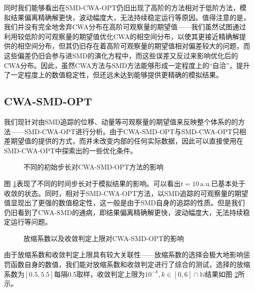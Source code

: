 同时我们能够看出在SMD-CWA-OPT仍旧出现了高阶的方法相对于低阶方法，模拟结果偏离精确解更快，波动幅度大，无法持续稳定运行等原因。值得注意的是，我们并没有完全地舍弃CWA分布在高阶可观察量的期望值——我们虽然试图通过利用较低阶的可观察量的期望值优化CWA的相空间分布，以使其更接近精确解提供的相空间分布，但其仍旧存在着高阶可观察量的期望值相对偏差较大的问题，而这些偏差仍旧会参与进SMD的演化方程中，而这些误差又反过来影响优化后的CWA分布。因此，虽然CWA方法与SMD方法能够形成一定程度上的``自洽''，提升了一定程度上的数值稳定性，但还远未达到能够提供更精确的模拟结果。

\subsection{CWA-SMD-OPT}
我们现针对由SMD追踪的位移、动量等可观察量的期望值来反映整个体系的的方法——SMD-CWA-OPT进行分析。由于CWA-SMD-OPT与SMD-CWA-OPT只相差期望值的提供的方式，而并未改变内部的任何实际数据，因此可以直接使用在SMD-CWA-OPT中探索出的一些优化条件。
\begin{figure}
\centering
{}
\caption{不同的初始步长对CWA-SMD-OPT方法的影响}
\label{cwa-smd-opt-dt}
\end{figure}

图 \ref{cwa-smd-opt-dt}表现了不同的时间步长对于模拟结果的影响。可以看出$t = 10 \, \mathrm{a.u.}$已基本处于收敛的状态。同时，相对于SMD-CWA-OPT方法，以SMD追踪的可观察量的期望值显现出了更强的数值稳定性，这一般是由于SMD自身的追踪的性质。但是我们仍旧看到了CWA-SMD的通病，即结果偏离精确解更快，波动幅度大，无法持续稳定运行等问题。

\begin{figure}
\centering
{}
\caption{放缩系数以及收敛判定上限对CWA-SMD-OPT的影响}
\label{scaling-tolerance}
\end{figure}

由于放缩系数和收敛判定上限具有较大关联性——放缩系数的选择会极大地影响惩罚函数自身的数值，我们能对放缩系数和收敛判定进行了综合的测试，选择的放缩系数为$[0.5, 5.5]$每隔0.5取样，收敛判定上限为$10^{-k}, k \in [0,6] \cap \mathbb{N}$结果如图 \ref{scaling-tolerance}所示。